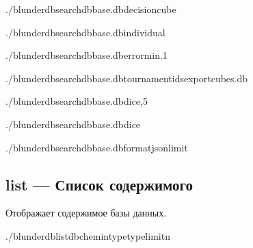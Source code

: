\documentclass[letterpaper,10pt,russian]{sphinxmanual}
\begin{document}
\sphinxAtStartPar
{}

\begin{sphinxVerbatim}[commandchars=\\\{\}]
./blunderdbsearch\PYGZhy{}\PYGZhy{}dbbase.db\PYGZhy{}\PYGZhy{}decisioncube

./blunderdbsearch\PYGZhy{}\PYGZhy{}dbbase.db\PYGZhy{}\PYGZhy{}individual

./blunderdbsearch\PYGZhy{}\PYGZhy{}dbbase.db\PYGZhy{}\PYGZhy{}error\PYGZhy{}min.1

./blunderdbsearch\PYGZhy{}\PYGZhy{}dbbase.db\PYGZhy{}\PYGZhy{}tournament\PYGZhy{}ids\PYGZhy{}\PYGZhy{}exportcubes.db

./blunderdbsearch\PYGZhy{}\PYGZhy{}dbbase.db\PYGZhy{}\PYGZhy{}dice,5

./blunderdbsearch\PYGZhy{}\PYGZhy{}dbbase.db\PYGZhy{}\PYGZhy{}dice

./blunderdbsearch\PYGZhy{}\PYGZhy{}dbbase.db\PYGZhy{}\PYGZhy{}formatjson\PYGZhy{}\PYGZhy{}limit
\end{sphinxVerbatim}


\subsection{list — Список содержимого}
\label{\detokenize{cli:list-lister-le-contenu}}
\sphinxAtStartPar
Отображает содержимое базы данных.

\begin{sphinxVerbatim}[commandchars=\\\{\}]
./blunderdblist\PYGZhy{}\PYGZhy{}db\PYGZlt{}chemin\PYGZgt{}\PYGZhy{}\PYGZhy{}type\PYGZlt{}type\PYGZgt{}\PYG{o}{[}\PYGZhy{}\PYGZhy{}limit\PYGZlt{}n\PYGZgt{}\PYG{o}{]}
\end{sphinxVerbatim}
\end{document}
